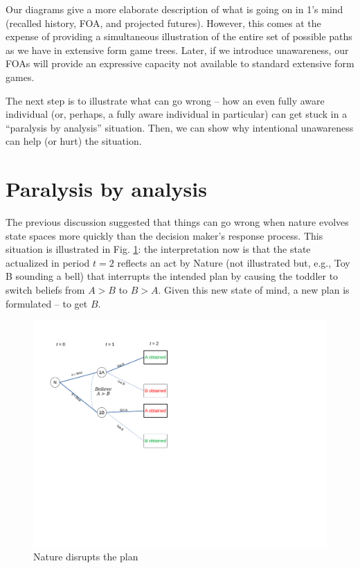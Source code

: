 \documentclass[
11pt,
titlepage,
reqno,
]{article}%
\theoremstyle{definition}
\begin{document}
Our diagrams give a more elaborate description of what is going on in 1's mind (recalled history, FOA, and projected futures). However, this comes at the expense of providing a simultaneous illustration of the entire set of possible paths as we have in extensive form game trees. Later, if we introduce unawareness, our FOAs will provide an expressive capacity not available to standard extensive form games. 

The next step is to illustrate what can go wrong -- how an even fully aware individual (or, perhaps, a fully aware individual in particular) can get stuck in a ``paralysis by analysis'' situation. Then, we can show why intentional unawareness can help (or hurt) the situation.

\section*{Paralysis by analysis}
The previous discussion suggested that things can go wrong when nature evolves state spaces more quickly than the decision maker's response process. This situation is illustrated in Fig. \ref{Diag: p-09}: the interpretation now is that the state actualized in period $t=2$ reflects an act by Nature (not illustrated but, e.g., Toy B sounding a bell) that interrupts the intended plan by causing the toddler to switch beliefs from $A>B$ to $B>A$. Given this new state of mind, a new plan is formulated -- to get $B$.

\begin{figure}[h!]
	\centering
	\includegraphics*[page=9,trim = 0 3.5in 0in 0in,scale=.65]{Awareness_Diagrams_All}
	\caption{Nature disrupts the plan\label{Diag: p-09}}%
\end{figure}
\end{document}
